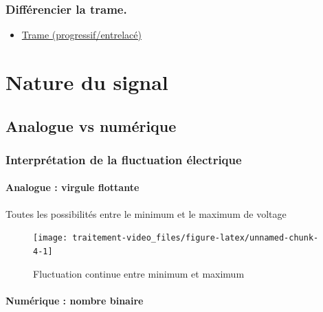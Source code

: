 \documentclass[
  french,
]{book}
\providecommand{\tightlist}{%
  \setlength{\itemsep}{0pt}\setlength{\parskip}{0pt}}
\begin{document}
\hypertarget{diffuxe9rencier-la-trame.}{%
\subsubsection{Différencier la trame.}\label{diffuxe9rencier-la-trame.}}

\begin{itemize}
\tightlist
\item
  \href{https://web.archive.org/web/20140222010640/http://neuron2.net/LVG/interlacing.html}{Trame (progressif/entrelacé)}
\end{itemize}

\hypertarget{nature-du-signal}{%
\section{Nature du signal}\label{nature-du-signal}}

\hypertarget{analogue-vs-numuxe9rique}{%
\subsection{Analogue vs numérique}\label{analogue-vs-numuxe9rique}}

\hypertarget{interpruxe9tation-de-la-fluctuation-uxe9lectrique}{%
\subsubsection{Interprétation de la fluctuation électrique}\label{interpruxe9tation-de-la-fluctuation-uxe9lectrique}}

\hypertarget{analogue-virgule-flottante}{%
\paragraph{Analogue : virgule flottante}\label{analogue-virgule-flottante}}

Toutes les possibilités entre le minimum et le maximum de voltage

\begin{figure}

{\centering \texttt{[image: traitement-video\_files/figure-latex/unnamed-chunk-4-1]} 

}

\caption{Fluctuation continue entre minimum et maximum}\label{fig:unnamed-chunk-4}
\end{figure}

\hypertarget{numuxe9rique-nombre-binaire}{%
\paragraph{Numérique : nombre binaire}\label{numuxe9rique-nombre-binaire}}
\end{document}
